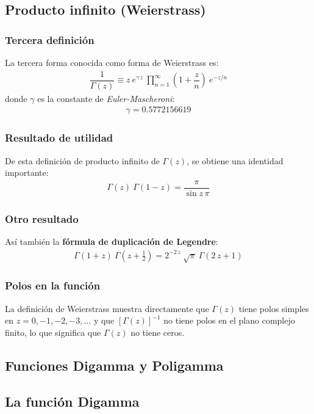 \documentclass[12pt]{beamer}
\begin{document}
\subsection{Producto infinito (Weierstrass)}

\begin{frame}
\frametitle{Tercera definición}
La tercera forma conocida como forma de Weierstrass es:
\pause
\begin{align}
\dfrac{1}{\Gamma (z)} \equiv z \:  e^{\gamma \, z} \: \prod_{n=1}^{\infty} \left( 1 + \dfrac{z}{n} \right) \: e^{-z/n}
\label{eq:ecuacion_10_16}
\end{align}
donde $\gamma$ es la constante de \emph{Euler-Mascheroni}:
\begin{align}
\gamma = 0.5772156619
\label{eq:ecuacion_10_17}
\end{align}
\end{frame}
\begin{frame}
\frametitle{Resultado de utilidad}
De esta definición de producto infinito de $\Gamma (z)$, se obtiene una identidad importante:
\pause
\begin{align}
\Gamma (z) \: \Gamma (1 - z) = \dfrac{\pi}{\sin z \, \pi}
\label{eq:ecuacion_10_23}
\end{align}
\end{frame}
\begin{frame}
\frametitle{Otro resultado}
Así también la \textbf{fórmula de duplicación de Legendre}:
\pause
\begin{align}
\Gamma (1 + z) \: \Gamma (z + \frac{1}{2}) = 2^{-2 \, z} \: \sqrt{\pi} \: \Gamma (2 \, z + 1)
\label{eq:ecuacion_10_24b}
\end{align}
\end{frame}
\begin{frame}
\frametitle{Polos en la función}
La definición de Weierstrass muestra directamente que $\Gamma (z)$ tiene polos simples en $z = 0, -1, -2, -3, \ldots$ y que $[\Gamma (z)]^{-1}$ no tiene polos en el plano complejo finito, lo que significa que $\Gamma (z)$ no tiene ceros.
\end{frame}

\subsection{Funciones Digamma y Poligamma}

\subsection*{La función Digamma}
\end{document}
